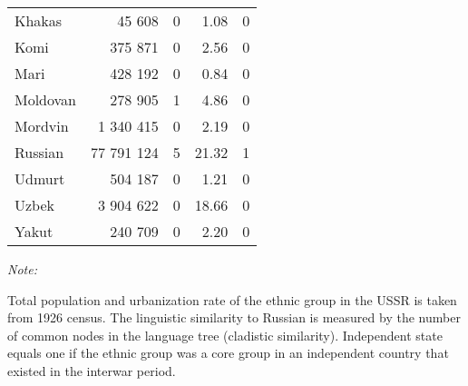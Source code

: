 \begin{table}[!h]
\begin{threeparttable}
\begin{tabular}{lrrrr}
Khakas & 45 608 & 0 & 1.08 & 0\\
Komi & 375 871 & 0 & 2.56 & 0\\
Mari & 428 192 & 0 & 0.84 & 0\\
Moldovan & 278 905 & 1 & 4.86 & 0\\
Mordvin & 1 340 415 & 0 & 2.19 & 0\\
Russian & 77 791 124 & 5 & 21.32 & 1\\
Udmurt & 504 187 & 0 & 1.21 & 0\\
Uzbek & 3 904 622 & 0 & 18.66 & 0\\
Yakut & 240 709 & 0 & 2.20 & 0\\
\bottomrule
\end{tabular}
\begin{tablenotes}
\item \textit{Note: } 
\item Total population and urbanization rate of the ethnic group in the USSR is taken from 1926 census. The linguistic similarity to Russian is measured by the number of common nodes in the language tree (cladistic similarity). Independent state equals one if the ethnic group was a core group in an independent country that existed in the interwar period.
\end{tablenotes}
\end{threeparttable}
\end{table}